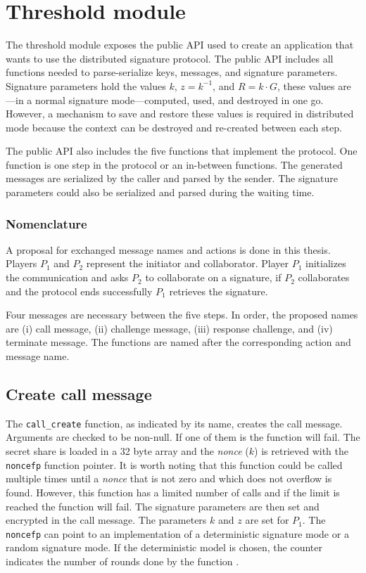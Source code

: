 \section{Threshold module}

The threshold module exposes the public API used to create an application that
wants to use the distributed signature protocol. The public API includes all
functions needed to parse-serialize keys, messages, and signature parameters.
Signature parameters hold the values $k$, $z = k^{-1}$, and $R = k \cdot G$,
these values are---in a normal signature mode---computed, used, and destroyed in
one go. However, a mechanism to save and restore these values is required in
distributed mode because the context can be destroyed and re-created between
each step.

The public API also includes the five functions that implement the protocol. One
function is one step in the protocol or an in-between functions. The generated
messages are serialized by the caller and parsed by the sender. The signature
parameters could also be serialized and parsed during the waiting time.

\subsubsection{Nomenclature}

A proposal for exchanged message names and actions is done in this thesis.
Players $P_1$ and $P_2$ represent the initiator and collaborator. Player $P_1$
initializes the communication and asks $P_2$ to collaborate on a signature, if
$P_2$ collaborates and the protocol ends successfully $P_1$ retrieves the
signature.

Four messages are necessary between the five steps. In order, the proposed names
are (i) call message, (ii) challenge message, (iii) response challenge, and (iv)
terminate message. The functions are named after the corresponding action and
message name.

\subsection{Create call message}

The \texttt{call\_create} function, as indicated by its name, creates the call
message. Arguments are checked to be non-null.  If one of them is the function
will fail. The secret share is loaded in a 32 byte array and the \textit{nonce} ($k$) is
retrieved with the \texttt{noncefp} function pointer. It is worth noting that
this function could be called multiple times until a \textit{nonce} that is not zero and
which does not overflow is found. However, this function has a limited number of
calls and if the limit is reached the function will fail. The signature
parameters are then set and encrypted in the call message. The parameters $k$
and $z$ are set for $P_1$. The \texttt{noncefp} can point to an implementation
of a deterministic signature mode or a random signature mode. If
the deterministic model is chosen, the counter indicates the number of rounds
done by the function \cite{rfc6979}.

